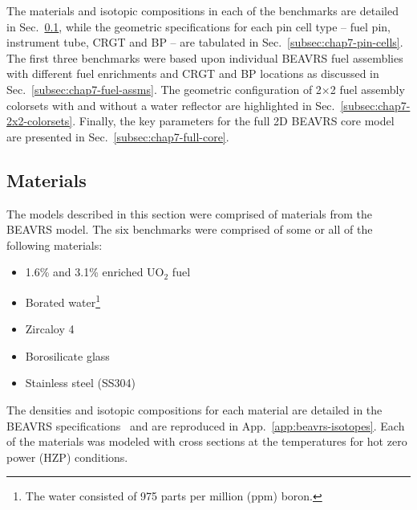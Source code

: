
The materials and isotopic compositions in each of the benchmarks are detailed in Sec.~\ref{subsec:chap7-materials}, while the geometric specifications for each pin cell type -- fuel pin, instrument tube, \ac{CRGT} and \ac{BP} -- are tabulated in Sec.~\ref{subsec:chap7-pin-cells}. The first three benchmarks were based upon individual \ac{BEAVRS} fuel assemblies with different fuel enrichments and \ac{CRGT} and \ac{BP} locations as discussed in Sec.~\ref{subsec:chap7-fuel-assms}. The geometric configuration of 2$\times$2 fuel assembly colorsets with and without a water reflector are highlighted in Sec.~\ref{subsec:chap7-2x2-colorsets}. Finally, the key parameters for the full 2D \ac{BEAVRS} core model are presented in Sec.~\ref{subsec:chap7-full-core}.


\subsection{Materials}
\label{subsec:chap7-materials}

The models described in this section were comprised of materials from the \ac{BEAVRS} model. The six benchmarks were comprised of some or all of the following materials:

\begin{itemize}[noitemsep,topsep=0pt]
  \item 1.6\% and 3.1\% enriched UO$_2$ fuel
  \item Borated water\footnote{The water consisted of 975 parts per million (ppm) boron.}
  \item Zircaloy 4
  \item Borosilicate glass
  \item Stainless steel (SS304)
\end{itemize}

\noindent The densities and isotopic compositions for each material are detailed in the \ac{BEAVRS} specifications~\cite{horelik2013beavrs} and are reproduced in App.~\ref{app:beavrs-isotopes}. Each of the materials was modeled with cross sections at the temperatures for hot zero power (HZP) conditions.

